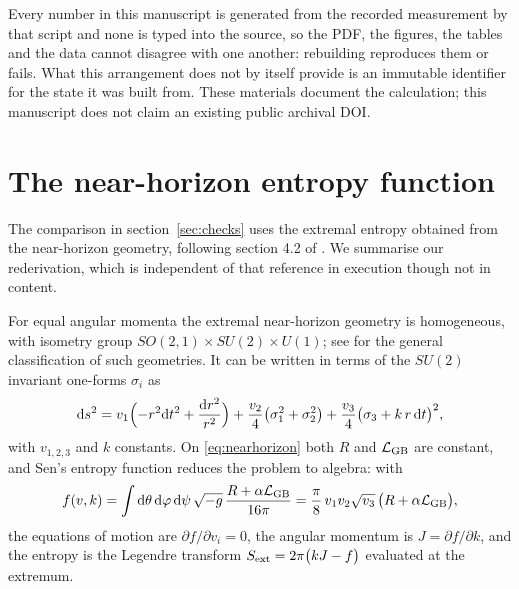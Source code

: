 \documentclass[11pt,a4paper]{article}
\begin{document}
Every number in this manuscript is generated from the recorded measurement by
that script and none is typed into the source, so the PDF, the figures, the
tables and the data cannot disagree with one another: rebuilding reproduces
them or fails. What this arrangement does not by itself provide is an
immutable identifier for the state it was built from.
These materials document the calculation; this manuscript does
not claim an existing public archival DOI.

\section{The near-horizon entropy function}
\label{app:nearhorizon}

The comparison in section~\ref{sec:checks} uses the extremal entropy obtained
from the near-horizon geometry, following section 4.2 of \cite{Brihaye:2010wp}.
We summarise our rederivation, which is independent of that reference in
execution though not in content.

For equal angular momenta the extremal near-horizon geometry is homogeneous,
with isometry group $SO(2,1)\times SU(2)\times U(1)$; see \cite{Kunduri:2013gce}
for the general classification of such geometries. It can be written in terms of
the $SU(2)$ invariant one-forms $\sigma_{i}$ as
\begin{equation}
  \mathrm{d} s^{2} = v_{1}\Bigl(-r^{2}\mathrm{d} t^{2} + \frac{\mathrm{d} r^{2}}{r^{2}}\Bigr)
  + \frac{v_{2}}{4}\bigl(\sigma_{1}^{2}+\sigma_{2}^{2}\bigr)
  + \frac{v_{3}}{4}\bigl(\sigma_{3} + k\,r\,\mathrm{d} t\bigr)^{2},
  \label{eq:nearhorizon}
\end{equation}
with $v_{1,2,3}$ and $k$ constants. On \eqref{eq:nearhorizon} both $R$ and
$\mathcal{L}_{\mathrm{GB}}$ are constant, and Sen's entropy function \cite{Sen:2007qy}
reduces the problem to algebra: with
\begin{equation}
  f(v,k) = \int \mathrm{d}\theta\,\mathrm{d}\varphi\,\mathrm{d}\psi\,\sqrt{-g}\,
  \frac{R+\alpha\mathcal{L}_{\mathrm{GB}}}{16\pi}
  = \frac{\pi}{8}\,v_{1}v_{2}\sqrt{v_{3}}\,
  \bigl(R+\alpha\mathcal{L}_{\mathrm{GB}}\bigr),
\end{equation}
the equations of motion are $\partial f/\partial v_{i}=0$, the angular momentum
is $J=\partial f/\partial k$, and the entropy is the Legendre transform
$S_{\mathrm{ext}} = 2\pi\bigl(kJ-f\bigr)$ evaluated at the extremum.
\end{document}
